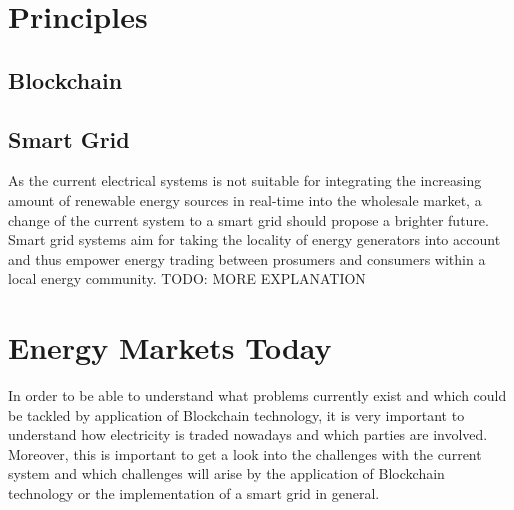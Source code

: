 \documentclass[runningheads]{llncs}
\begin{document}
\section{Principles}

\subsection{Blockchain}

\subsection{Smart Grid}
As the current electrical systems is not suitable for integrating the increasing amount of renewable energy sources in real-time into the wholesale market, a change of the current system to a smart grid should propose a brighter future. Smart grid systems aim for taking the locality of energy generators into account and thus empower energy trading between prosumers and consumers within a local energy community. \cite{mengelkamp_lem}
TODO: MORE EXPLANATION

\section{Energy Markets Today}
In order to be able to understand what problems currently exist and which could be tackled by application of Blockchain technology, it is very important to understand how electricity is traded nowadays and which parties are involved. Moreover, this is important to get a look into the challenges with the current system and which challenges will arise by the application of Blockchain technology or the implementation of a smart grid in general.
\end{document}

